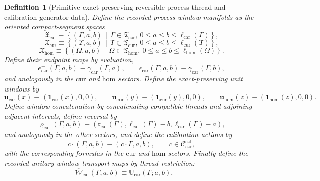 \documentclass[11pt]{article}
\newcommand{\TensorWindowClass}{\mathfrak X_{\mathrm{car}}}
\newcommand{\CurWindowClass}{\mathfrak X_{\mathrm{cur}}}
\newcommand{\HomWindowClass}{\mathfrak X_{\mathrm{hom}}}
\newcommand{\TensorCalGroup}{\mathcal C_{\mathrm{car}}^{\mathrm{cal}}}
\newcommand{\TensorWindowRep}{\overline{\mathscr W}_{\mathrm{car}}}
\newcommand{\TensorThreadClass}{\mathfrak T_{\mathrm{car}}}
\newcommand{\CurThreadClass}{\mathfrak T_{\mathrm{cur}}}
\newcommand{\HomThreadClass}{\mathfrak T_{\mathrm{hom}}}
\newcommand{\TensorThreadLength}{\ell_{\mathrm{car}}}
\newcommand{\CurThreadLength}{\ell_{\mathrm{cur}}}
\newcommand{\HomThreadLength}{\ell_{\mathrm{hom}}}
\newcommand{\TensorThreadEval}{\gamma_{\mathrm{car}}}
\newcommand{\TensorThreadUnit}{\mathbf 1_{\mathrm{car}}}
\newcommand{\CurThreadUnit}{\mathbf 1_{\mathrm{cur}}}
\newcommand{\HomThreadUnit}{\mathbf 1_{\mathrm{hom}}}
\newcommand{\TensorThreadRev}{\mathfrak r_{\mathrm{car}}}
\newcommand{\TensorThreadRep}{\mathbb U_{\mathrm{car}}}
\newtheorem{definition}{Definition}
\begin{document}
\begin{definition}[Primitive exact-preserving reversible process-thread and calibration-generator data]
Define the recorded process-window manifolds as the oriented compact-segment spaces
\begin{equation}
\TensorWindowClass
\equiv
\left\{(\Gamma,a,b)\,\middle|\,\Gamma\in\TensorThreadClass,\ 0\le a\le b\le \TensorThreadLength(\Gamma)\right\},
\label{eq:window_car}
\end{equation}
\begin{equation}
\CurWindowClass
\equiv
\left\{(\Upsilon,a,b)\,\middle|\,\Upsilon\in\CurThreadClass,\ 0\le a\le b\le \CurThreadLength(\Upsilon)\right\},
\label{eq:window_cur}
\end{equation}
\begin{equation}
\HomWindowClass
\equiv
\left\{(\Omega,a,b)\,\middle|\,\Omega\in\HomThreadClass,\ 0\le a\le b\le \HomThreadLength(\Omega)\right\}.
\label{eq:window_hom}
\end{equation}
Define their endpoint maps by evaluation,
\begin{equation}
\epsilon_{\mathrm{car}}^{-}(\Gamma,a,b)\equiv \TensorThreadEval(\Gamma,a),\qquad
\epsilon_{\mathrm{car}}^{+}(\Gamma,a,b)\equiv \TensorThreadEval(\Gamma,b),
\label{eq:window_endpoints_car}
\end{equation}
and analogously in the \(\mathrm{cur}\) and \(\mathrm{hom}\) sectors. Define the exact-preserving unit windows by
\begin{equation}
\mathbf u_{\mathrm{car}}(x)\equiv(\TensorThreadUnit(x),0,0),\qquad
\mathbf u_{\mathrm{cur}}(y)\equiv(\CurThreadUnit(y),0,0),\qquad
\mathbf u_{\mathrm{hom}}(z)\equiv(\HomThreadUnit(z),0,0).
\label{eq:window_units}
\end{equation}
Define window concatenation by concatenating compatible threads and adjoining adjacent intervals, define reversal by
\begin{equation}
\varrho_{\mathrm{car}}(\Gamma,a,b)\equiv
\left(\TensorThreadRev(\Gamma),\TensorThreadLength(\Gamma)-b,\TensorThreadLength(\Gamma)-a\right),
\label{eq:window_reversal_car}
\end{equation}
and analogously in the other sectors, and define the calibration actions by
\begin{equation}
c\cdot(\Gamma,a,b)\equiv(c\cdot\Gamma,a,b),
\qquad
c\in\TensorCalGroup,
\label{eq:window_calibration_car}
\end{equation}
with the corresponding formulas in the \(\mathrm{cur}\) and \(\mathrm{hom}\) sectors. Finally define the recorded unitary window transport maps by thread restriction:
\begin{equation}
\TensorWindowRep(\Gamma,a,b)\equiv\TensorThreadRep(\Gamma;a,b),\qquad

\end{equation}
\end{definition}
\end{document}
